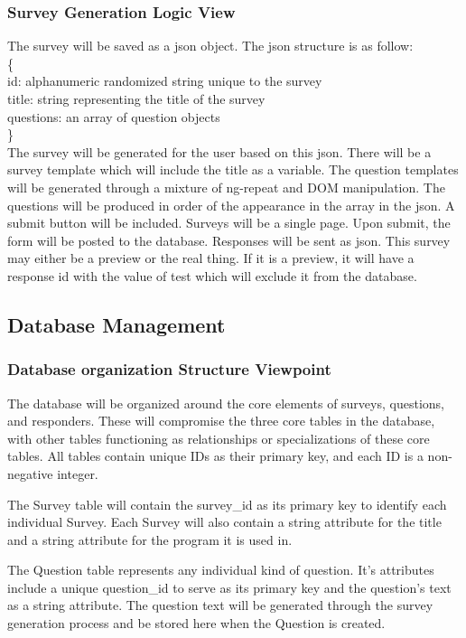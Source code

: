 \documentclass[letterpaper,10pt,serif, draftclsnofoot,onecolumn, compsoc, titlepage]{IEEEtran}
\begin{document}
\subsubsection{Survey Generation Logic View}
The survey will be saved as a json object. The json structure is as follow:\\
\{\\
\indent id: alphanumeric randomized string unique to the survey\\
\indent title: string representing the title of the survey\\
\indent questions: an array of question objects\\
\}\\
The survey will be generated for the user based on this json. There will be a survey template which will include the title as a variable.
The question templates will be generated through a mixture of ng-repeat and DOM manipulation. The questions will be produced in 
order of the appearance in the array in the json. A submit button will be included. Surveys will be a single page. Upon submit, the form will be posted to the database. Responses will be sent as json. This survey may either be a preview or the real thing. If it is a 
preview, it will have a response id with the value of test which will exclude it from the database.

\subsection{Database Management}
\subsubsection{Database organization Structure Viewpoint}
The database will be organized around the core elements of surveys, questions, and responders.
These will compromise the three core tables in the database, with other tables functioning as relationships or specializations of these core tables.
All tables contain unique IDs as their primary key, and each ID is a non-negative integer.

The Survey table will contain the survey\_id as its primary key to identify each individual Survey.
Each Survey will also contain a string attribute for the title and a string attribute for the program it is used in.

The Question table represents any individual kind of question.
It's attributes include a unique question\_id to serve as its primary key and the question's text as a string attribute.
The question text will be generated through the survey generation process and be stored here when the Question is created.
\end{document}
